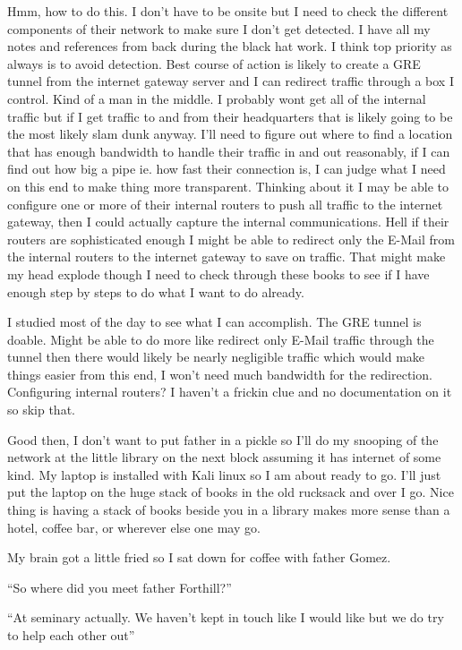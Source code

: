 Hmm, how to do this. I don't have to be onsite but I need to check the different components of their network to make sure I don't get detected. I have all my notes and references from back during the black hat work. I think top priority as always is to avoid detection. Best course of action is likely to create a GRE tunnel from the internet gateway server and I can redirect traffic through a box I control. Kind of a man in the middle. I probably wont get all of the internal traffic but if I get traffic to and from their headquarters that is likely going to be the most likely slam dunk anyway. I'll need to figure out where to find a location that has enough bandwidth to handle their traffic in and out reasonably, if I can find out how big a pipe ie. how fast their connection is, I can judge what I need on this end to make thing more transparent. Thinking about it I may be able to configure one or more of their internal routers to push all traffic to the internet gateway, then I could actually capture the internal communications. Hell if their routers are sophisticated enough I might be able to redirect only the E-Mail from the internal routers to the internet gateway to save on traffic. That might make my head explode though I need to check through these books to see if I have enough step by steps to do what I want to do already.

I studied most of the day to see what I can accomplish. The GRE tunnel is doable. Might be able to do more like redirect only E-Mail traffic through the tunnel then there would likely be nearly negligible traffic which would make things easier from this end, I won't need much bandwidth for the redirection. Configuring internal routers? I haven't a frickin clue and no documentation on it so skip that.

Good then, I don't want to put father in a pickle so I'll do my snooping of the network at the little library on the next block assuming it has internet of some kind. My laptop is installed with Kali linux so I am about ready to go. I'll just put the laptop on the huge stack of books in the old rucksack and over I go. Nice thing is having a stack of books beside you in a library makes more sense than a hotel, coffee bar, or wherever else one may go.

My brain got a little fried so I sat down for coffee with father Gomez.

``So where did you meet father Forthill?''

``At seminary actually. We haven't kept in touch like I would like but we do try to help each other out''

